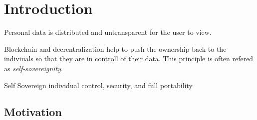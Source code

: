 \chapter{Introduction}
\label{cha:introduction}

Personal data is distributed and untransparent for the user to view.\cite[p. 1]{uPortWhitePaper}

Blockchain and decrentralization help to push the ownership back to the indiviuals so that they are in controll of their data. This principle is often refered as \textit{self-sovereignity}.\cite[p. 1]{uPortWhitePaper}


Self Sovereign individual control, security, and full portability

\section{Motivation}